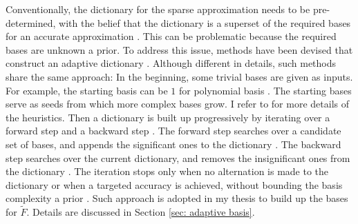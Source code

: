 Conventionally, the dictionary for the sparse approximation needs to
be pre-determined, with the belief that the dictionary is a superset of the required bases
for an accurate approximation \cite{adaptive basis 2}. 
This can be problematic because the required bases are unknown a prior.
To address this issue, methods have been devised that construct an adaptive dictionary
\cite{adaptive basis 1, adaptive basis 2, adaptive basis 3}.
Although different in details, such methods share the same approach: In the beginning, some trivial
bases are given as inputs.
For example, the starting basis can be $1$ for polynomial basis \cite{adaptive basis 1}.
The starting bases serve as seeds from which more complex bases grow. I refer to 
\cite{adaptive basis 1, adaptive basis 2, adaptive basis 3} for more details of the heuristics. 
Then a dictionary is built up progressively 
by iterating over a forward step and a backward step
\cite{adaptive basis 1, adaptive basis 2, adaptive basis 3}.
The forward step searches over a candidate set of bases, and appends the significant ones 
to the dictionary
\cite{adaptive basis 1, adaptive basis 2, adaptive basis 3}.
The backward step searches over the current dictionary, and removes the 
insignificant ones from the dictionary
\cite{adaptive basis 1, adaptive basis 2, adaptive basis 3}.
The iteration stops only when no alternation is made to the dictionary or when a targeted 
accuracy is achieved, without bounding the basis complexity a prior
\cite{adaptive basis 1, adaptive basis 2, adaptive basis 3}.
Such approach is adopted in my thesis to build up 
the bases for $\tilde{F}$. Details are discussed in Section \ref{sec: adaptive basis}.\\





